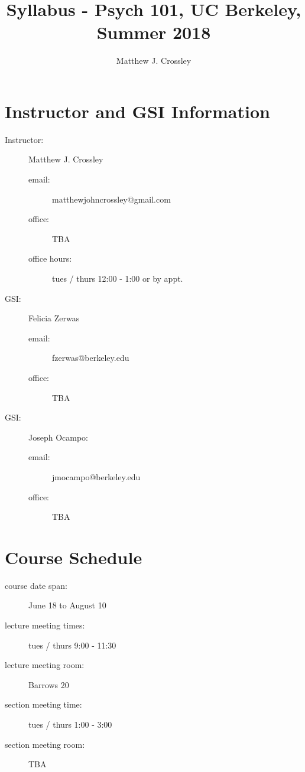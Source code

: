 \documentclass{article}
\begin{document}
\title{Syllabus - Psych 101, UC Berkeley, Summer 2018}
\author{Matthew J. Crossley}
\maketitle

\section{Instructor and GSI Information}
\begin{description}
\item [Instructor:] Matthew J. Crossley
  \begin{description}
  \item [email:] matthewjohncrossley@gmail.com
  \item [office:] TBA
  \item [office hours:] tues / thurs 12:00 - 1:00 or by appt.
  \end{description}

\item [GSI:] Felicia Zerwas
  \begin{description}
  \item [email:] fzerwas@berkeley.edu
  \item [office:] TBA
  \end{description}

\item [GSI:] Joseph Ocampo:
    \begin{description}
  \item [email:] jmocampo@berkeley.edu
  \item [office:] TBA
  \end{description}
\end{description}

\section{Course Schedule}
\begin{description}
\item [course date span:] June 18 to August 10
\item [lecture meeting times:] tues / thurs 9:00 - 11:30
\item [lecture meeting room:] Barrows 20
\item [section meeting time:] tues / thurs 1:00 - 3:00
\item [section meeting room:] TBA
\end{description}
\end{document}
